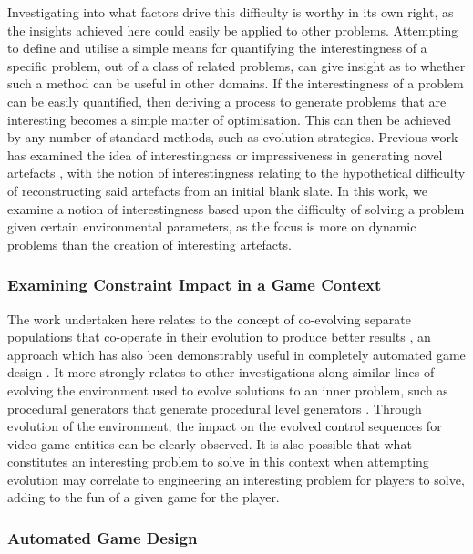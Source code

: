 \documentclass[conference]{IEEEtran}
\begin{document}
Investigating into what factors drive this difficulty is worthy in its own right, as the insights achieved here could easily be applied to other problems. Attempting to define and utilise a simple means for quantifying the interestingness of a specific problem, out of a class of related problems, can give insight as to whether such a method can be useful in other domains. If the interestingness of a problem can be easily quantified, then deriving a process to generate problems that are interesting becomes a simple matter of optimisation. This can then be achieved by any number of standard methods, such as evolution strategies. Previous work has examined the idea of interestingness or impressiveness in generating novel artefacts \cite{lehman12}, with the notion of interestingness relating to the hypothetical difficulty of reconstructing said artefacts from an initial blank slate. In this work, we examine a notion of interestingness based upon the difficulty of solving a problem given certain environmental parameters, as the focus is more on dynamic problems than the creation of interesting artefacts. 

\subsubsection{Examining Constraint Impact in a Game Context}

The work undertaken here relates to the concept of co-evolving separate populations that co-operate in their evolution to produce better results \cite{potter94}, an approach which has also been demonstrably useful in completely automated game design \cite{cook12}.
It more strongly relates to other investigations along similar lines of evolving the environment used to evolve solutions to an inner problem, such as procedural generators that generate procedural level generators \cite{kerssemakers12}. Through evolution of the environment, the impact on the evolved control sequences for video game entities can be clearly observed. It is also possible that what constitutes an interesting problem to solve in this context when attempting evolution may correlate to engineering an interesting problem for players to solve, adding to the fun \cite{koster04} \cite{pedersen10} of a given game for the player. 

\subsubsection{Automated Game Design}
\end{document}

